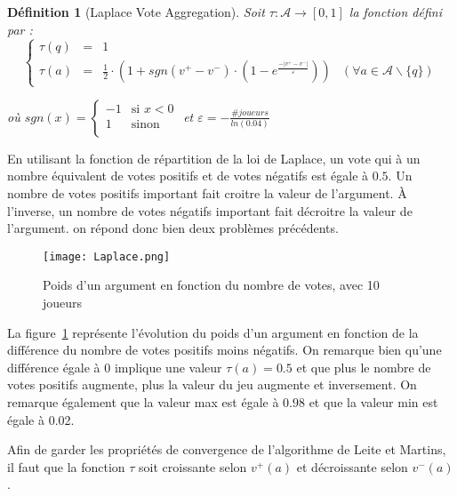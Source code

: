 \documentclass[11pt]{article}
\theoremstyle{defi}
\newtheorem{definition}{Définition}[section]
\theoremstyle{not}
\theoremstyle{prob}
\begin{document}
    \begin{definition}[Laplace Vote Aggregation]
      Soit $\tau : \mathcal{A} \rightarrow [0, 1]$ la fonction défini par :
      $$
        \left\{\begin{array}{llll}
          \tau(q) & = & 1 & \\
          \tau(a) & = & \frac{1}{2} \cdot \left(1 + sgn(v^+ - v^-) \cdot \left(1 - e^{\frac{-|v^+ - v^-|}{\varepsilon}}\right)\right) & (\forall a \in \mathcal{A} \backslash \{q\})
        \end{array}\right.
      $$

      où
      $sgn(x) = \left\{
        \begin{array}{ll}
          -1  & \mbox{si } x < 0 \\
          1 & \mbox{sinon} \\
        \end{array}
      \right.$
      et $\varepsilon = - \frac{\#joueurs}{ln(0.04)}$

    \end{definition}

    En utilisant la fonction de répartition de la loi de Laplace, un vote qui à un nombre équivalent de votes positifs et de votes négatifs est égale à $0.5$. Un nombre de votes positifs important fait croitre la valeur de l'argument. À l'inverse, un nombre de votes négatifs important fait décroitre la valeur de l'argument.
    on répond donc bien deux problèmes précédents.

    \begin{figure}
      \center
      \texttt{[image: Laplace.png]}
      \caption{Poids d'un argument en fonction du nombre de votes, avec 10 joueurs}
      \label{fig:Laplace}
    \end{figure}

    La figure~\ref{fig:Laplace} représente l'évolution du poids d'un argument en fonction de la différence du nombre de votes positifs moins négatifs.
    On remarque bien qu'une différence égale à 0 implique une valeur $\tau(a) = 0.5$ et que plus le nombre de votes positifs augmente, plus la valeur du jeu augmente et inversement.
    On remarque également que la valeur max est égale à $0.98$ et que la valeur min est égale à 0.02.




    Afin de garder les propriétés de convergence de l'algorithme de Leite et Martins, il faut que la fonction $\tau$ soit croissante selon $v^+(a)$ et décroissante selon $v^-(a)$.
\end{document}

